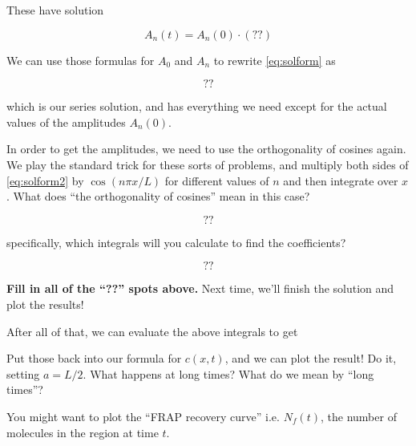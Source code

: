 \documentclass[12pt]{article}
\begin{document}
These have solution

\begin{equation}
  A_n(t) = A_n(0)\cdot(??)
\end{equation}

\answer{
\[
  A_n(t) = A_n(0)e^{-(Dn^2\pi^2/L^2)t}
\]
}

We can use those formulas for $A_0$ and $A_n$ to rewrite
\eqref{eq:solform} as

\begin{equation}
\label{eq:solform2}
  ??
\end{equation}
\answer{
\[
  c(x,t) = A_0(t) + \sum_{n=1}^\infty 
A_n(0)e^{-(Dn^2\pi^2/L^2)t}
\cos\left(\frac{x}{L}n\pi\right)
 \]
}

which is our series solution, and has everything we need except for
the actual values of the amplitudes $A_n(0)$.

In order to get the amplitudes, we need to use the orthogonality of
cosines again. We play the standard trick for these sorts of problems,
and multiply both sides of \eqref{eq:solform2} by $\cos(n\pi x/L)$ for
different values of $n$ and then integrate over $x$. What does ``the
orthogonality of cosines'' mean in this case?


\begin{equation}
  ??
\end{equation}

\answer{
\[
\int_{-L}^L
\cos\left(\frac{x}{L}n\pi\right)
\cos\left(\frac{x}{L}m\pi\right)
dx = L\delta_{n,m}
\]
}

specifically, which integrals will you calculate to find the
coefficients?

\begin{equation}
  ??
\end{equation}


{\bf Fill in all of the ``??'' spots above.} Next time, we'll finish
the solution and plot the results!

After all of that, we can evaluate the above integrals to get


Put those back into our formula for $c(x,t)$, and we can plot the
result! Do it, setting $a=L/2$. What happens at long times? What do we
mean by ``long times''?

You might want to plot the ``FRAP recovery curve'' i.e. $N_f(t)$, the
number of molecules in the region at time $t$.
\end{document}
